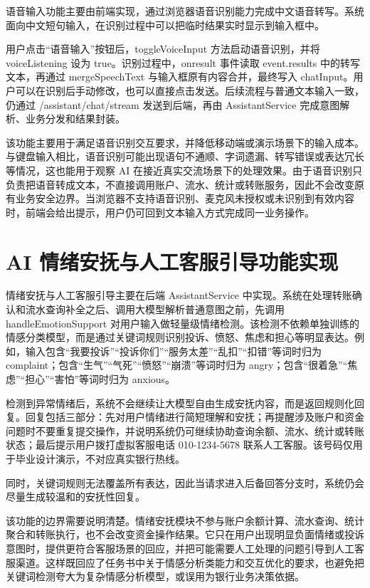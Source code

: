 \documentclass[bachelor, print]{xduthesis}
\begin{document}
语音输入功能主要由前端实现，通过浏览器语音识别能力完成中文语音转写。系统面向中文短句输入，在识别过程中可以把临时结果实时显示到输入框中。

用户点击“语音输入”按钮后，toggleVoiceInput 方法启动语音识别，并将 voiceListening 设为 true。识别过程中，onresult 事件读取 event.results 中的转写文本，再通过 mergeSpeechText 与输入框原有内容合并，最终写入 chatInput。用户可以在识别后手动修改，也可以直接点击发送。后续流程与普通文本输入一致，仍通过 /assistant/chat/stream 发送到后端，再由 AssistantService 完成意图解析、业务分发和结果封装。

该功能主要用于满足语音识别交互要求，并降低移动端或演示场景下的输入成本。与键盘输入相比，语音识别可能出现语句不通顺、字词遗漏、转写错误或表达冗长等情况，这也能用于观察 AI 在接近真实交流场景下的处理效果。由于语音识别只负责把语音转成文本，不直接调用账户、流水、统计或转账服务，因此不会改变原有业务安全边界。当浏览器不支持语音识别、麦克风未授权或未识别到有效内容时，前端会给出提示，用户仍可回到文本输入方式完成同一业务操作。

\section{AI 情绪安抚与人工客服引导功能实现}

情绪安抚与人工客服引导主要在后端 AssistantService 中实现。系统在处理转账确认和流水查询补全之后、调用大模型解析普通意图之前，先调用 handleEmotionSupport 对用户输入做轻量级情绪检测。该检测不依赖单独训练的情感分类模型，而是通过关键词规则识别投诉、愤怒、焦虑和担心等明显表达。例如，输入包含“我要投诉”“投诉你们”“服务太差”“乱扣”“扣错”等词时归为 complaint；包含“生气”“气死”“愤怒”“崩溃”等词时归为 angry；包含“很着急”“焦虑”“担心”“害怕”等词时归为 anxious。

检测到异常情绪后，系统不会继续让大模型自由生成安抚内容，而是返回规则化回复。回复包括三部分：先对用户情绪进行简短理解和安抚；再提醒涉及账户和资金问题时不要重复提交操作，并说明系统仍可继续协助查询余额、流水、统计或转账状态；最后提示用户拨打虚拟客服电话 010-1234-5678 联系人工客服。该号码仅用于毕业设计演示，不对应真实银行热线。

同时，关键词规则无法覆盖所有表达，因此当请求进入后备回答分支时，系统仍会尽量生成较温和的安抚性回复。

该功能的边界需要说明清楚。情绪安抚模块不参与账户余额计算、流水查询、统计聚合和转账执行，也不会改变资金操作结果。它只在用户出现明显负面情绪或投诉意图时，提供更符合客服场景的回应，并把可能需要人工处理的问题引导到人工客服渠道。这样既回应了任务书中关于情感分析类能力和交互优化的要求，也避免把关键词检测夸大为复杂情感分析模型，或误用为银行业务决策依据。
\end{document}
